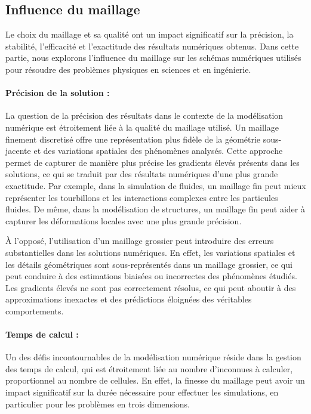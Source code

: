 \subsection{Influence du maillage}

Le choix du maillage et sa qualité ont un impact significatif sur la précision, la stabilité, l'efficacité et l'exactitude des résultats numériques obtenus. Dans cette partie, nous explorons l'influence du maillage sur les schémas numériques utilisés pour résoudre des problèmes physiques en sciences et en ingénierie.

\paragraph{Précision de la solution :}

La question de la précision des résultats dans le contexte de la modélisation numérique est étroitement liée à la qualité du maillage utilisé. Un maillage finement discretisé offre une représentation plus fidèle de la géométrie sous-jacente et des variations spatiales des phénomènes analysés. Cette approche permet de capturer de manière plus précise les gradients élevés présents dans les solutions, ce qui se traduit par des résultats numériques d'une plus grande exactitude. Par exemple, dans la simulation de fluides, un maillage fin peut mieux représenter les tourbillons et les interactions complexes entre les particules fluides. De même, dans la modélisation de structures, un maillage fin peut aider à capturer les déformations locales avec une plus grande précision.

À l'opposé, l'utilisation d'un maillage grossier peut introduire des erreurs substantielles dans les solutions numériques. En effet, les variations spatiales et les détails géométriques sont sous-représentés dans un maillage grossier, ce qui peut conduire à des estimations biaisées ou incorrectes des phénomènes étudiés. Les gradients élevés ne sont pas correctement résolus, ce qui peut aboutir à des approximations inexactes et des prédictions éloignées des véritables comportements.


\paragraph{Temps de calcul :}

Un des défis incontournables de la modélisation numérique réside dans la gestion des temps de calcul, qui est étroitement liée au nombre d'inconnues à calculer, proportionnel au nombre de cellules. En effet, la finesse du maillage peut avoir un impact significatif sur la durée nécessaire pour effectuer les simulations, en particulier pour les problèmes en trois dimensions.

